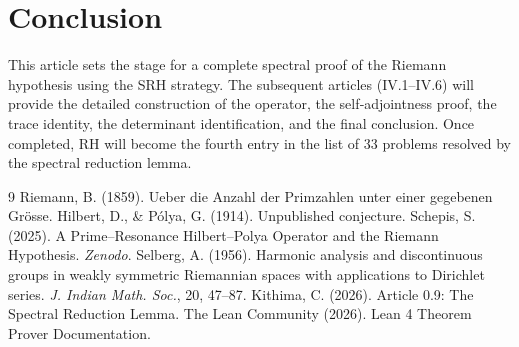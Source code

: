 \documentclass[11pt,a4paper]{article}
\begin{document}
\section{Conclusion}

This article sets the stage for a complete spectral proof of the Riemann hypothesis using the SRH strategy. The subsequent articles (IV.1–IV.6) will provide the detailed construction of the operator, the self‑adjointness proof, the trace identity, the determinant identification, and the final conclusion. Once completed, RH will become the fourth entry in the list of 33 problems resolved by the spectral reduction lemma.


\begin{thebibliography}{9}
  Riemann, B. (1859). Ueber die Anzahl der Primzahlen unter einer gegebenen Grösse.
  Hilbert, D., \& Pólya, G. (1914). Unpublished conjecture.
  Schepis, S. (2025). A Prime–Resonance Hilbert–Polya Operator and the Riemann Hypothesis. \emph{Zenodo}.
  Selberg, A. (1956). Harmonic analysis and discontinuous groups in weakly symmetric Riemannian spaces with applications to Dirichlet series. \emph{J. Indian Math. Soc.}, 20, 47–87.
  Kithima, C. (2026). Article 0.9: The Spectral Reduction Lemma.
  The Lean Community (2026). Lean 4 Theorem Prover Documentation.
\end{thebibliography}
\end{document}
